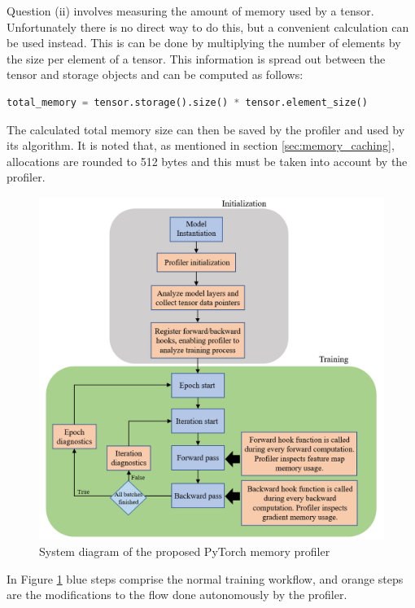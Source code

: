 \documentclass[12pt,letterpaper]{article}
\begin{document}
Question (ii) involves measuring the amount of memory used by a tensor. Unfortunately there is no direct way to do this, but a convenient calculation can be used instead. This is can be done by multiplying the number of elements by the size per element of a tensor. This information is spread out between the tensor and storage objects and can be computed as follows:
\begin{lstlisting}[language=Python]
total_memory = tensor.storage().size() * tensor.element_size()
\end{lstlisting}
The calculated total memory size can then be saved by the profiler and used by its algorithm. It is noted that, as mentioned in section \ref{sec:memory_caching}, allocations are rounded to 512 bytes and this must be taken into account by the profiler.
\par 

\begin{figure}[ht]
\centering
\includegraphics[width=1.0\textwidth]{profiler_system_diagram.PNG}
\captionsetup{width=0.9\linewidth}
\caption{System diagram of the proposed PyTorch memory profiler}
\label{fig:profiler_system_diagram}
\end{figure}

In Figure \ref{fig:profiler_system_diagram} blue steps comprise the normal training workflow, and orange steps are the modifications to the flow done autonomously by the profiler.
\end{document}

